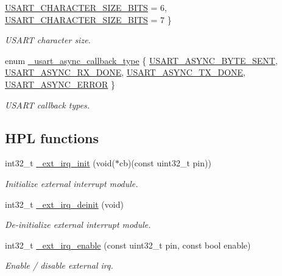 \begin{DoxyCompactItemize}
\hyperlink{group___h_p_l_gga631ce7b4f60dccd392e6d6ef7d3cd4e2ad8f2a75feeac704acc0b9af6947e4734}{U\+S\+A\+R\+T\+\_\+\+C\+H\+A\+R\+A\+C\+T\+E\+R\+\_\+\+S\+I\+Z\+E\+\_\+B\+I\+TS} = 6, 
\newline
\hyperlink{group___h_p_l_gga631ce7b4f60dccd392e6d6ef7d3cd4e2a9fe87d41d9dd672038c67eaea63d6d96}{U\+S\+A\+R\+T\+\_\+\+C\+H\+A\+R\+A\+C\+T\+E\+R\+\_\+\+S\+I\+Z\+E\+\_\+B\+I\+TS} = 7
 \}\begin{DoxyCompactList}\small\item\em U\+S\+A\+RT character size. \end{DoxyCompactList}
\item 
enum \hyperlink{group___h_p_l_gace00dc77ac02c91f8bf35551b484927c}{\+\_\+usart\+\_\+async\+\_\+callback\+\_\+type} \{ \hyperlink{group___h_p_l_ggace00dc77ac02c91f8bf35551b484927ca5cbff5ce7030edf0c23f4e2291839142}{U\+S\+A\+R\+T\+\_\+\+A\+S\+Y\+N\+C\+\_\+\+B\+Y\+T\+E\+\_\+\+S\+E\+NT}, 
\hyperlink{group___h_p_l_ggace00dc77ac02c91f8bf35551b484927cad2ef0bf5b401a3c576c17cab2a6df7bf}{U\+S\+A\+R\+T\+\_\+\+A\+S\+Y\+N\+C\+\_\+\+R\+X\+\_\+\+D\+O\+NE}, 
\hyperlink{group___h_p_l_ggace00dc77ac02c91f8bf35551b484927ca8a94d01c89c71f1bf2a1b68edadbfbfa}{U\+S\+A\+R\+T\+\_\+\+A\+S\+Y\+N\+C\+\_\+\+T\+X\+\_\+\+D\+O\+NE}, 
\hyperlink{group___h_p_l_ggace00dc77ac02c91f8bf35551b484927cac9790dc229a5fa436d2ef48e8ac1024c}{U\+S\+A\+R\+T\+\_\+\+A\+S\+Y\+N\+C\+\_\+\+E\+R\+R\+OR}
 \}\begin{DoxyCompactList}\small\item\em U\+S\+A\+RT callback types. \end{DoxyCompactList}
\end{DoxyCompactItemize}
\subsection*{H\+PL functions}
\begin{DoxyCompactItemize}
\item 
int32\+\_\+t \hyperlink{group___h_p_l_gad7c12a758c9839e074d1d97d255e09ab}{\+\_\+ext\+\_\+irq\+\_\+init} (void($\ast$cb)(const uint32\+\_\+t pin))
\begin{DoxyCompactList}\small\item\em Initialize external interrupt module. \end{DoxyCompactList}\item 
int32\+\_\+t \hyperlink{group___h_p_l_gad29f685cb658b260303c55fb7a88cdb0}{\+\_\+ext\+\_\+irq\+\_\+deinit} (void)
\begin{DoxyCompactList}\small\item\em De-\/initialize external interrupt module. \end{DoxyCompactList}\item 
int32\+\_\+t \hyperlink{group___h_p_l_gac2fa4b43da6356425b0188b744b6f4cc}{\+\_\+ext\+\_\+irq\+\_\+enable} (const uint32\+\_\+t pin, const bool enable)
\begin{DoxyCompactList}\small\item\em Enable / disable external irq. \end{DoxyCompactList}\end{DoxyCompactItemize}
